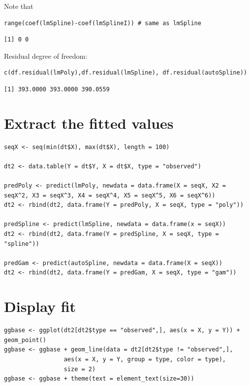 \documentclass[12pt]{article}
\begin{document}
Note that
\lstset{language=r,label= ,caption= ,captionpos=b,numbers=none}
\begin{lstlisting}
range(coef(lmSpline)-coef(lmSplineI)) # same as lmSpline
\end{lstlisting}

\begin{verbatim}
[1] 0 0
\end{verbatim}

Residual degree of freedom:
\begin{lstlisting}
c(df.residual(lmPoly),df.residual(lmSpline), df.residual(autoSpline))
\end{lstlisting}

\begin{verbatim}
[1] 393.0000 393.0000 390.0559
\end{verbatim}


\section{Extract the fitted values}
\label{sec:org3f14cb4}
\begin{lstlisting}
seqX <- seq(min(dt$X), max(dt$X), length = 100)

dt2 <- data.table(Y = dt$Y, X = dt$X, type = "observed")

predPoly <- predict(lmPoly, newdata = data.frame(X = seqX, X2 = seqX^2, X3 = seqX^3, X4 = seqX^4, X5 = seqX^5, X6 = seqX^6))
dt2 <- rbind(dt2, data.frame(Y = predPoly, X = seqX, type = "poly"))

predSpline <- predict(lmSpline, newdata = data.frame(x = seqX))
dt2 <- rbind(dt2, data.frame(Y = predSpline, X = seqX, type = "spline"))

predGam <- predict(autoSpline, newdata = data.frame(X = seqX))
dt2 <- rbind(dt2, data.frame(Y = predGam, X = seqX, type = "gam"))
\end{lstlisting}


\section{Display fit}
\label{sec:orgebb46c4}

\begin{lstlisting}
ggbase <- ggplot(dt2[dt2$type == "observed",], aes(x = X, y = Y)) + geom_point()
ggbase <- ggbase + geom_line(data = dt2[dt2$type != "observed",],
			     aes(x = X, y = Y, group = type, color = type),
			     size = 2)
ggbase <- ggbase + theme(text = element_text(size=30))
\end{lstlisting}
\end{document}
